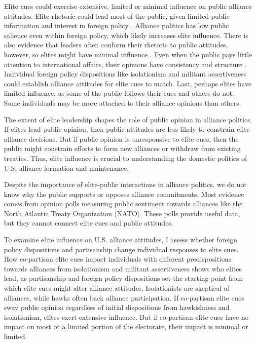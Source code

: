 \documentclass[12pt]{article}
\begin{document}
Elite cues could exercise extensive, limited or minimal influence on public alliance attitudes. 
Elite rhetoric could lead most of the public, given limited public information and interest in foreign policy \citep{Canes-Wrone2006, BaumPotter2008, Druckman2014}.
Alliance politics has low public salience even within foreign policy, which likely increases elite influence. 
There is also evidence that leaders often conform their rhetoric to public attitudes, however, so elites might have minimal influence  \citep{Barberaetal2019, HagerHilbig2020}.
Even when the public pays little attention to international affairs, their opinions have consistency and structure \citep{Holsti1992, PageShapiro1992}.
Individual foreign policy dispositions like isolationism and militant assertiveness \citep{Herrmannetal1999, KertzerZeitzoff2017} could establish alliance attitudes for elite cues to match.
Last, perhaps elites have limited influence, as some of the public follows their cues and others do not. 
Some individuals may be more attached to their alliance opinions than others.


The extent of elite leadership shapes the role of public opinion in alliance politics.
If elites lead public opinion, then public attitudes are less likely to constrain elite alliance decisions.
But if public opinion is unresponsive to elite cues, then the public might constrain efforts to form new alliances or withdraw from existing treaties. 
Thus, elite influence is crucial to understanding the domestic politics of U.S. alliance formation and maintenance.  


Despite the importance of elite-public interactions in alliance politics, we do not know why the public supports or opposes alliance commitments. 
Most evidence comes from opinion polls measuring public sentiment towards alliances like the North Atlantic Treaty Organization (NATO).
These polls provide useful data, but they cannot connect elite cues and public attitudes.


To examine elite influence on U.S. alliance attitudes, I assess whether foreign policy dispositions and partisanship change individual responses to elite cues.
How co-partisan elite cues impact individuals with different predispositions towards alliances from isolationism and militant assertiveness shows who elites lead, as partisanship and foreign policy dispositions set the starting point from which elite cues might alter alliance attitudes. 
Isolationists are skeptical of alliances, while hawks often back alliance participation. 
If co-partisan elite cues sway public opinion regardless of initial dispositions from hawkishness and isolationism, elites exert extensive influence. 
But if co-partisan elite cues have no impact on most or a limited portion of the electorate, their impact is minimal or limited.
\end{document}
